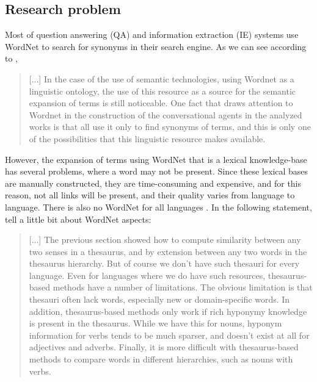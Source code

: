 \subsection{Research problem} 

Most of question answering (QA) and information extraction (IE) systems use WordNet to search for synonyms in their search engine. As we can see according to , 
\begin{quote}
    [...] In the case of the use of semantic technologies, using Wordnet as a linguistic ontology, the use of this resource as a source for the semantic expansion of terms is still noticeable. One fact that draws attention to Wordnet in the construction of the conversational agents in the analyzed works is that all use it only to find synonyms of terms, and this is only one of the possibilities that this linguistic resource makes available.
\end{quote}

However, the expansion of terms using WordNet that is a lexical knowledge-base has several problems, where a word may not be present. Since these lexical bases are manually constructed, they are time-consuming and expensive, and for this reason, not all links will be present, and their quality varies from language to language. There is also no WordNet for all languages \cite{Leeuwenberga2016}. In the following statement,  tell a little bit about WordNet aspects:
\begin{quote}
    [...]
    The previous section showed how to compute similarity between any two senses in a thesaurus, and by extension between any two words in the thesaurus hierarchy. But of course we don't have such thesauri for every language. Even for languages where we do have such resources, thesaurus-based methods have a number of limitations. The obvious limitation is that thesauri often lack words, especially new or domain-specific words. In addition, thesaurus-based methods only work if rich hyponymy knowledge is present in the thesaurus. While we have this for nouns, hyponym information for verbs tends to be much sparser, and doesn't exist at all for adjectives and adverbs. Finally, it is more difficult with thesaurus-based methods to compare words in different hierarchies, such as nouns with verbs.
\end{quote}

